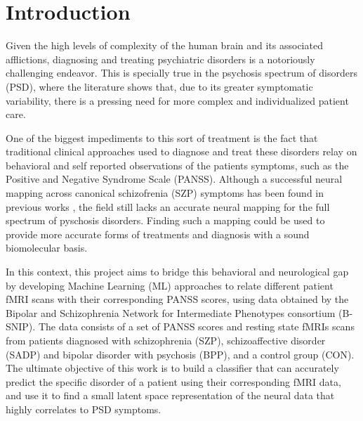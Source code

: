 \documentclass[fleqn,moreauthors,10pt]{ds_report}
\affiliation{\textit{Advisors: Prof. Dr. Jure Demšar}}
\begin{document}
\flushbottom 

\maketitle 

\thispagestyle{empty} 


\section*{Introduction}

    Given the high levels of complexity of the human brain and its associated afflictions, diagnosing and treating psychiatric disorders is a notoriously challenging endeavor. This is specially true in the psychosis spectrum of disorders (PSD), where the literature shows that, due to its greater symptomatic variability, there is a pressing need for more complex and individualized patient care.

    One of the biggest impediments to this sort of treatment is the fact that traditional clinical approaches used to diagnose and treat these disorders relay on behavioral and self reported observations of the patients symptoms, such as the Positive and Negative Syndrome Scale (PANSS). Although a successful neural mapping across canonical schizofrenia (SZP) symptoms has been found in previous works \cite{Chen2020}, the field still lacks an accurate neural mapping for the full spectrum of pyschosis disorders. Finding such a mapping could be used to provide more accurate forms of treatments and diagnosis with a sound biomolecular basis.

    In this context, this project aims to bridge this behavioral and neurological gap by developing Machine Learning (ML) approaches to relate different patient fMRI scans with their corresponding PANSS scores, using data obtained by the Bipolar and Schizophrenia Network for Intermediate Phenotypes consortium (B-SNIP)\cite{Clementz2016}. The data consists of a set of PANSS scores and resting state fMRIs scans from patients diagnosed with schizophrenia (SZP), schizoaffective disorder (SADP) and bipolar disorder with psychosis (BPP), and a control group (CON). The ultimate objective of this work is to build a classifier that can accurately predict the specific disorder of a patient using their corresponding fMRI data, and use it to find a small latent space representation of the neural data that highly correlates to PSD symptoms.
    
\end{document}
